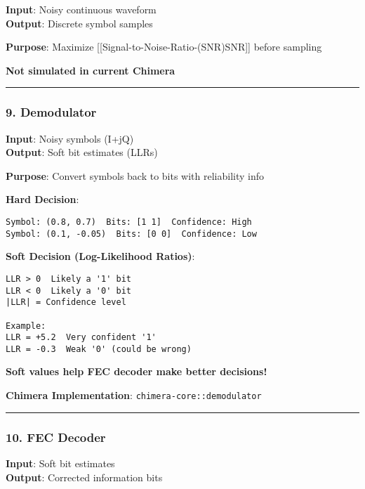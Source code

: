 \textbf{Input}: Noisy continuous waveform\\
\textbf{Output}: Discrete symbol samples

\textbf{Purpose}: Maximize
{[}{[}Signal-to-Noise-Ratio-(SNR)\textbar SNR{]}{]} before sampling

\textbf{Not simulated in current Chimera}

\begin{center}\rule{0.5\linewidth}{0.5pt}\end{center}

\subsubsection{9. Demodulator}\label{demodulator}

\textbf{Input}: Noisy symbols (I+jQ)\\
\textbf{Output}: Soft bit estimates (LLRs)

\textbf{Purpose}: Convert symbols back to bits with reliability info

\textbf{Hard Decision}:

\begin{verbatim}
Symbol: (0.8, 0.7)  Bits: [1 1]  Confidence: High 
Symbol: (0.1, -0.05)  Bits: [0 0]  Confidence: Low 
\end{verbatim}

\textbf{Soft Decision (Log-Likelihood Ratios)}:

\begin{verbatim}
LLR > 0  Likely a '1' bit
LLR < 0  Likely a '0' bit
|LLR| = Confidence level

Example:
LLR = +5.2  Very confident '1'
LLR = -0.3  Weak '0' (could be wrong)
\end{verbatim}

\textbf{Soft values help FEC decoder make better decisions!}

\textbf{Chimera Implementation}: \texttt{chimera-core::demodulator}

\begin{center}\rule{0.5\linewidth}{0.5pt}\end{center}

\subsubsection{10. FEC Decoder}\label{fec-decoder}

\textbf{Input}: Soft bit estimates\\
\textbf{Output}: Corrected information bits

